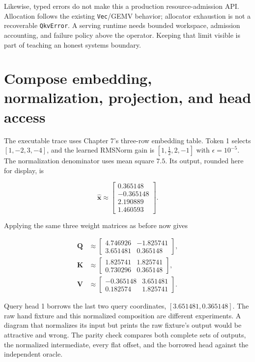 Likewise, typed errors do not make this a production resource-admission
API. Allocation follows the existing \texttt{Vec}/GEMV behavior;
allocator exhaustion is not a recoverable \texttt{QkvError}. A serving
runtime needs bounded workspace, admission accounting, and failure
policy above the operator. Keeping that limit visible is part of
teaching an honest systems boundary.

\section{Compose embedding, normalization, projection, and head
access}\label{compose-embedding-normalization-projection-and-head-access}

The executable trace uses Chapter 7's three-row embedding table. Token 1
selects \([1,-2,3,-4]\), and the learned RMSNorm gain is
\([1,\tfrac12,2,-1]\) with \(\epsilon=10^{-5}\). The normalization
denominator uses mean square \(7.5\). Its output, rounded here for
display, is

\begin{equation}
\widehat{\mathbf{x}}\approx
\begin{bmatrix}
0.365148\\-0.365148\\2.190889\\1.460593
\end{bmatrix}.
\end{equation}

Applying the same three weight matrices as before now gives

\begin{equation}
\begin{aligned}
\mathbf{Q}&\approx
\begin{bmatrix}4.746926&-1.825741\\3.651481&0.365148\end{bmatrix},\\
\mathbf{K}&\approx
\begin{bmatrix}1.825741&1.825741\\0.730296&0.365148\end{bmatrix},\\
\mathbf{V}&\approx
\begin{bmatrix}-0.365148&3.651481\\0.182574&1.825741\end{bmatrix}.
\end{aligned}
\end{equation}

Query head 1 borrows the last two query coordinates,
\([3.651481,0.365148]\). The raw hand fixture and this normalized
composition are different experiments. A diagram that normalizes its
input but prints the raw fixture's output would be attractive and wrong.
The parity check compares both complete sets of outputs, the normalized
intermediate, every flat offset, and the borrowed head against the
independent oracle.

